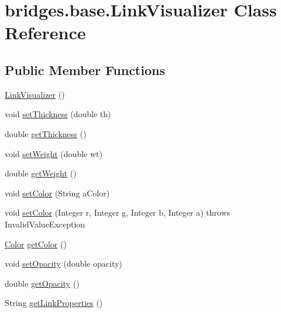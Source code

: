\hypertarget{classbridges_1_1base_1_1_link_visualizer}{}\section{bridges.\+base.\+Link\+Visualizer Class Reference}
\label{classbridges_1_1base_1_1_link_visualizer}
\subsection*{Public Member Functions}
\begin{DoxyCompactItemize}
\item 
\hyperlink{classbridges_1_1base_1_1_link_visualizer_a0b69f099fa264ae9097b0efe278c6a1b}{Link\+Visualizer} ()
\item 
void \hyperlink{classbridges_1_1base_1_1_link_visualizer_a702e9ca345d1a4a035baf2041f275849}{set\+Thickness} (double th)
\item 
double \hyperlink{classbridges_1_1base_1_1_link_visualizer_af1592d2a8664b00c1a51fdc0f8d1860a}{get\+Thickness} ()
\item 
void \hyperlink{classbridges_1_1base_1_1_link_visualizer_a21d5884d243cf5a08f9d544f5083a44c}{set\+Weight} (double wt)
\item 
double \hyperlink{classbridges_1_1base_1_1_link_visualizer_ac96d7fb118ae6c7e1bdd57c5e2c8639a}{get\+Weight} ()
\item 
void \hyperlink{classbridges_1_1base_1_1_link_visualizer_a8c77064e7f40caaf8c3ecda830273a7d}{set\+Color} (String a\+Color)
\item 
void \hyperlink{classbridges_1_1base_1_1_link_visualizer_a8e2d87dde5aabcb17811ab39dcf1db5c}{set\+Color} (Integer r, Integer g, Integer b, Integer a)  throws Invalid\+Value\+Exception 
\item 
\hyperlink{classbridges_1_1base_1_1_color}{Color} \hyperlink{classbridges_1_1base_1_1_link_visualizer_a3ed52d98ecab99c6d8dd136fba913b7d}{get\+Color} ()
\item 
void \hyperlink{classbridges_1_1base_1_1_link_visualizer_ac5243fa73d03d7e9e9fded596975741c}{set\+Opacity} (double opacity)
\item 
double \hyperlink{classbridges_1_1base_1_1_link_visualizer_aa8c6b6337f99226191369317036119bf}{get\+Opacity} ()
\item 
String \hyperlink{classbridges_1_1base_1_1_link_visualizer_ab64d9b7e2b99f7ebce80cbabfe4adf2a}{get\+Link\+Properties} ()
\end{DoxyCompactItemize}


